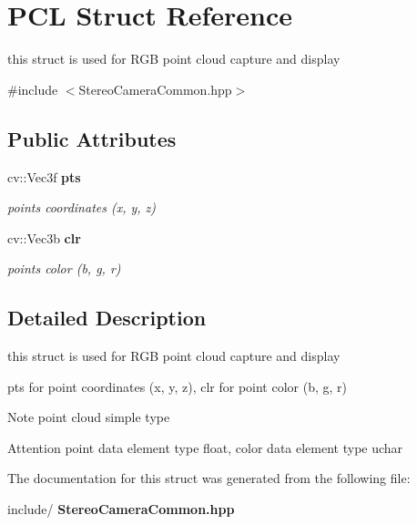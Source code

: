 \section{P\+CL Struct Reference}
\label{struct_p_c_l}


this struct is used for R\+GB point cloud capture and display  




{\ttfamily \#include $<$Stereo\+Camera\+Common.\+hpp$>$}

\subsection*{Public Attributes}
\begin{DoxyCompactItemize}
\item 
\mbox{\label{struct_p_c_l_a07c28b7f533724d91ec4a9e461989d8c}} 
cv\+::\+Vec3f \textbf{ pts}
\begin{DoxyCompactList}\small\item\em points coordinates (x, y, z) \end{DoxyCompactList}\item 
\mbox{\label{struct_p_c_l_a6555550c790378b130273dd6ae3a2158}} 
cv\+::\+Vec3b \textbf{ clr}
\begin{DoxyCompactList}\small\item\em points color (b, g, r) \end{DoxyCompactList}\end{DoxyCompactItemize}


\subsection{Detailed Description}
this struct is used for R\+GB point cloud capture and display 

pts for point coordinates (x, y, z), clr for point color (b, g, r) \begin{DoxyNote}{Note}
point cloud simple type 
\end{DoxyNote}
\begin{DoxyAttention}{Attention}
point data element type float, color data element type uchar 
\end{DoxyAttention}


The documentation for this struct was generated from the following file\+:\begin{DoxyCompactItemize}
\item 
include/\textbf{ Stereo\+Camera\+Common.\+hpp}\end{DoxyCompactItemize}
